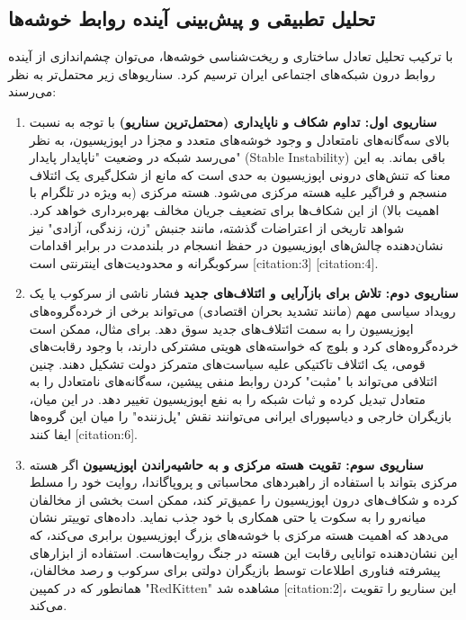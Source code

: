 \documentclass{article}
\begin{document}
	\subsection{تحلیل تطبیقی و پیش‌بینی آینده روابط خوشه‌ها}
	با ترکیب تحلیل تعادل ساختاری و ریخت‌شناسی خوشه‌ها، می‌توان چشم‌اندازی از آینده روابط درون شبکه‌های اجتماعی ایران ترسیم کرد. سناریوهای زیر محتمل‌تر به نظر می‌رسند:
	
	\begin{enumerate}
		\item \textbf{سناریوی اول: تداوم شکاف و ناپایداری (محتمل‌ترین سناریو)} با توجه به نسبت بالای سه‌گانه‌های نامتعادل و وجود خوشه‌های متعدد و مجزا در اپوزیسیون، به نظر می‌رسد شبکه در وضعیت "ناپایدار پایدار" (Stable Instability) باقی بماند. به این معنا که تنش‌های درونی اپوزیسیون به حدی است که مانع از شکل‌گیری یک ائتلاف منسجم و فراگیر علیه هسته مرکزی می‌شود. هسته مرکزی (به ویژه در تلگرام با اهمیت بالا) از این شکاف‌ها برای تضعیف جریان مخالف بهره‌برداری خواهد کرد. شواهد تاریخی از اعتراضات گذشته، مانند جنبش "زن، زندگی، آزادی" نیز نشان‌دهنده چالش‌های اپوزیسیون در حفظ انسجام در بلندمدت در برابر اقدامات سرکوبگرانه و محدودیت‌های اینترنتی است [citation:3] [citation:4].
		
		\item \textbf{سناریوی دوم: تلاش برای بازآرایی و ائتلاف‌های جدید} فشار ناشی از سرکوب یا یک رویداد سیاسی مهم (مانند تشدید بحران اقتصادی) می‌تواند برخی از خرده‌گروه‌های اپوزیسیون را به سمت ائتلاف‌های جدید سوق دهد. برای مثال، ممکن است خرده‌گروه‌های کرد و بلوچ که خواسته‌های هویتی مشترکی دارند، با وجود رقابت‌های قومی، یک ائتلاف تاکتیکی علیه سیاست‌های متمرکز دولت تشکیل دهند. چنین ائتلافی می‌تواند با "مثبت" کردن روابط منفی پیشین، سه‌گانه‌های نامتعادل را به متعادل تبدیل کرده و ثبات شبکه را به نفع اپوزیسیون تغییر دهد. در این میان، بازیگران خارجی و دیاسپورای ایرانی می‌توانند نقش "پل‌زننده" را میان این گروه‌ها ایفا کنند [citation:6].
		
		\item \textbf{سناریوی سوم: تقویت هسته مرکزی و به حاشیه‌راندن اپوزیسیون} اگر هسته مرکزی بتواند با استفاده از راهبردهای محاسباتی و پروپاگاندا، روایت خود را مسلط کرده و شکاف‌های درون اپوزیسیون را عمیق‌تر کند، ممکن است بخشی از مخالفان میانه‌رو را به سکوت یا حتی همکاری با خود جذب نماید. داده‌های توییتر نشان می‌دهد که اهمیت هسته مرکزی با خوشه‌های بزرگ اپوزیسیون برابری می‌کند، که این نشان‌دهنده توانایی رقابت این هسته در جنگ روایت‌هاست. استفاده از ابزارهای پیشرفته فناوری اطلاعات توسط بازیگران دولتی برای سرکوب و رصد مخالفان، همانطور که در کمپین "RedKitten" مشاهده شد [citation:2]، این سناریو را تقویت می‌کند.
	\end{enumerate}
\end{document}
